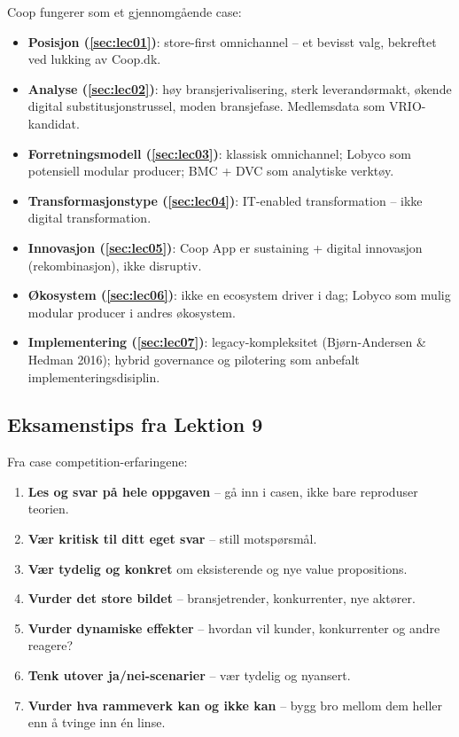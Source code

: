 Coop fungerer som et gjennomgående case:
\begin{itemize}
  \item \textbf{Posisjon (\autoref{sec:lec01})}: store-first omnichannel --
    et bevisst valg, bekreftet ved lukking av Coop.dk.
  \item \textbf{Analyse (\autoref{sec:lec02})}: høy bransjerivalisering,
    sterk leverandørmakt, økende digital substitusjonstrussel, moden
    bransjefase. Medlemsdata som VRIO-kandidat.
  \item \textbf{Forretningsmodell (\autoref{sec:lec03})}: klassisk
    omnichannel; Lobyco som potensiell modular producer; BMC + DVC som
    analytiske verktøy.
  \item \textbf{Transformasjonstype (\autoref{sec:lec04})}: IT-enabled
    transformation -- ikke digital transformation.
  \item \textbf{Innovasjon (\autoref{sec:lec05})}: Coop App er sustaining +
    digital innovasjon (rekombinasjon), ikke disruptiv.
  \item \textbf{Økosystem (\autoref{sec:lec06})}: ikke en ecosystem driver
    i dag; Lobyco som mulig modular producer i andres økosystem.
  \item \textbf{Implementering (\autoref{sec:lec07})}: legacy-kompleksitet
    (Bjørn-Andersen \& Hedman 2016); hybrid governance og pilotering som
    anbefalt implementeringsdisiplin.
\end{itemize}

\subsection{Eksamenstips fra Lektion 9}
Fra case competition-erfaringene:
\begin{enumerate}
  \item \textbf{Les og svar på hele oppgaven} -- \guillemotleft{}gå inn i casen\guillemotright{}, ikke
    bare reproduser teorien.
  \item \textbf{Vær kritisk til ditt eget svar} -- still motspørsmål.
  \item \textbf{Vær tydelig og konkret} om eksisterende og nye value
    propositions.
  \item \textbf{Vurder det store bildet} -- bransjetrender, konkurrenter,
    nye aktører.
  \item \textbf{Vurder dynamiske effekter} -- hvordan vil kunder,
    konkurrenter og andre reagere?
  \item \textbf{Tenk utover ja/nei-scenarier} -- vær tydelig og nyansert.
  \item \textbf{Vurder hva rammeverk kan og ikke kan} -- bygg bro mellom
    dem heller enn å tvinge inn én linse.
\end{enumerate}

